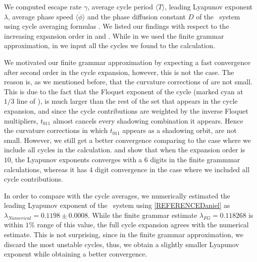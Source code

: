 We computed escape rate $\gamma$, average cycle period $\langle T \rangle$, leading Lyapunov exponent $\lambda$, average phase speed $\langle \dot{\phi} \rangle$ and the phase diffusion constant $D$ of the \twomode\ system using cycle averaging formulas . We listed our findings with respect to the increasing expansion order in  and . While in  we used the finite grammar approximation, in  we input all the cycles we found to the calculation. 




We motivated our finite grammar approximation by expecting a fast convergence after second order in the cycle expansion, however,
this is not the case. The reason is, as we mentioned before, that the curvature corrections of  are not small. This is due to the fact that the Floquet exponent of the cycle  (marked cyan at $1/3$ line of ), is much larger than the rest of the set that appears in the cycle expansion, and since the cycle contributions are weighted by the inverse Floquet multipliers, $t_{011}$ almost cancels every shadowing combination it appears. Hence the curvature corrections in which $t_{011}$ appears as a shadowing orbit, are not small. However, we still get a better convergence comparing to the case where we include all cycles in the calculation.  and  show that when the expansion order is $10$, the Lyapunov exponents converges with a $6$ digits in the finite grammmar calculations, whereas it has $4$ digit convergence in the case where we included all cycle contributions.

In order to compare with the cycle averages, we numerically estimated the leading Lyapunov exponent of the \twomode\ system using \ref{REFERENCEDaniel} as $\lambda_{Numerical} = 0.1198 \pm 0.0008$. While the finite grammar estimate $\lambda_{FG} = 0.118268$ is within $1\%$ range of this value, the full cycle expansion agrees with the numerical estimate. This is not surprising, since in the finite grammar approximation, we discard the most unstable cycles, thus, we obtain a slightly smaller Lyapunov exponent while obtaining a better convergence. 